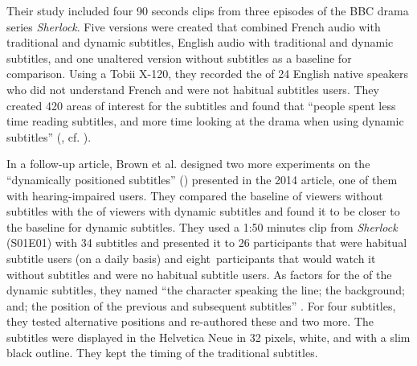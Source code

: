 Their study included four 90 seconds clips from three episodes of the BBC drama series \textit{Sherlock}. Five versions were created that combined French audio with traditional and dynamic subtitles, English audio with traditional and dynamic subtitles, and one unaltered version without subtitles as a baseline for comparison. Using a Tobii X-120, they recorded the  of 24 English native speakers who did not understand French and were not habitual subtitles users. They created 420 areas of interest for the subtitles and found that “people spent less time reading subtitles, and more time looking at the drama when using dynamic subtitles” (\citealt{Armstrong2014}, cf. \citealt{Brown2015}).

In a follow-up article, Brown et al. designed two more experiments on the “dynamically positioned subtitles” (\citeyear{Brown2015}) presented in the 2014 article, one of them with hearing-impaired users. They compared the baseline of viewers without subtitles with the  of viewers with dynamic subtitles and found it to be closer to the baseline for dynamic subtitles. They used a 1:50 minutes clip from \textit{Sherlock} (S01E01) with 34 subtitles and presented it to 26 participants that were habitual subtitle users (on a daily basis) and eight~participants that would watch it without subtitles and were no habitual subtitle users. As factors for the  of the dynamic subtitles, they named “the character speaking the line; the background; and; the position of the previous and subsequent subtitles” \citep{Brown2015}. For four subtitles, they tested alternative positions and re-authored these and two more. The subtitles were displayed in the   Helvetica Neue in 32 pixels, white, and with a slim black outline. They kept the timing of the traditional subtitles.

